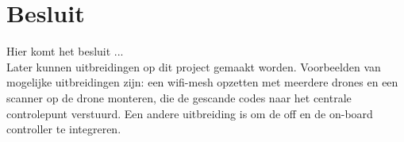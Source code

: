 \chapter{Besluit}
Hier komt het besluit ...\\

Later kunnen uitbreidingen op dit project gemaakt worden.
Voorbeelden van mogelijke uitbreidingen zijn: een wifi-mesh opzetten met meerdere 	drones en een scanner op de drone monteren, die de gescande codes naar het centrale controlepunt verstuurd.
Een andere uitbreiding is om de off en de on-board controller te integreren.
